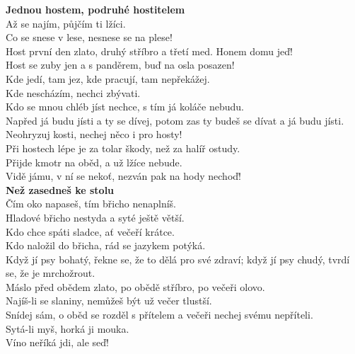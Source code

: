 \begin{multicols}{\value{columnsgames}}
\noindent
{\large\bf Jednou hostem, podruhé hostitelem}\\[1 mm]
Až se najím, půjčím ti lžíci.\\
Co se snese v lese, nesnese se na plese!\\
Host první den zlato, druhý stříbro a třetí med. Honem domu jeď!\\
Host se zuby jen a s panděrem, buď na osla posazen!\\
Kde jedí, tam jez, kde pracují, tam nepřekážej.\\
Kde nescházím, nechci zbývati.\\
Kdo se mnou chléb jíst nechce, s tím já koláče nebudu.\\
Napřed já budu jísti a ty se dívej, potom zas ty budeš se dívat 
a já budu jísti.\\
Neohryzuj kosti, nechej něco i pro hosty!\\
Při hostech lépe je za tolar škody, než za halíř ostudy.\\
Přijde kmotr na oběd, a už lžíce nebude.\\
Vidě jámu, v ní se nekoť, nezván pak na hody nechoď!\\

\noindent
{\large\bf Než zasedneš ke stolu}\\[1 mm]
Čím oko napaseš, tím břicho nenaplníš.\\
Hladové břicho nestyda a syté ještě větší.\\
Kdo chce spáti sladce, ať večeří krátce.\\
Kdo naložil do břicha, rád se jazykem potýká.\\
Když jí psy bohatý, řekne se, že to dělá pro své zdraví; když 
jí psy chudý, tvrdí se, že je mrchožrout.\\
Máslo před obědem zlato, po obědě stříbro, po večeři olovo.\\
Najíš-li se slaniny, nemůžeš být už večer tlustší.\\
Snídej sám, o oběd se rozděl s přítelem a večeři nechej svému 
nepříteli.\\
Sytá-li myš, horká ji mouka.\\
Víno neříká jdi, ale seď!\\


\end{multicols}
